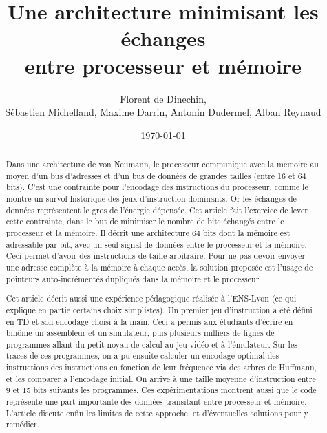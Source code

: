 \documentclass[architecture]{compas2018}
\begin{document}
\title{Une architecture minimisant les échanges\\ entre processeur et mémoire}

\author{Florent de Dinechin, \\Sébastien Michelland, Maxime Darrin, Antonin Dudermel, Alban Reynaud}

\address{
}

\date{\today}

\maketitle
\sloppy

\begin{abstract}
Dans une architecture de von Neumann, le processeur communique avec la mémoire au moyen d'un bus d'adresses et d'un bus de données de grandes tailles (entre 16 et 64 bits).
C'est une contrainte pour l'encodage des instructions du processeur, comme le montre un survol historique des jeux d'instruction dominants.
Or les échanges de données représentent le gros de l'énergie dépensée.
Cet article fait l'exercice de lever cette contrainte, dans le but de minimiser le nombre de bits échangés entre le processeur et la mémoire.
Il décrit une architecture 64 bits dont la mémoire est adressable par bit, avec un seul signal de données entre le processeur et la mémoire.
Ceci permet d'avoir des instructions de taille arbitraire.
Pour ne pas devoir envoyer une adresse complète à la mémoire à chaque accès, la solution proposée est l'usage de pointeurs auto-incrémentés dupliqués dans la mémoire et le processeur.

Cet article décrit aussi une expérience pédagogique réalisée à l'ENS-Lyon (ce qui explique en partie certains choix simplistes).
Un premier jeu d'instruction a été défini en TD et son encodage choisi à la main.
Ceci a permis aux étudiants d'écrire en binôme un assembleur et un simulateur, puis plusieurs milliers de lignes de programmes allant du petit noyau de calcul au jeu vidéo et à l'émulateur.
Sur les traces de ces programmes, on a pu ensuite calculer un encodage optimal des instructions des instructions en fonction de leur fréquence via des arbres de Huffmann, et les comparer à l'encodage initial.
On arrive à une taille moyenne d'instruction entre 9 et 15 bits suivants les programmes.
 Ces expérimentations montrent aussi que le code représente une part importante des données transitant entre processeur et mémoire. 
 L'article discute enfin les limites de cette approche, et d'éventuelles solutions pour y remédier.
\end{abstract}
\end{document}
